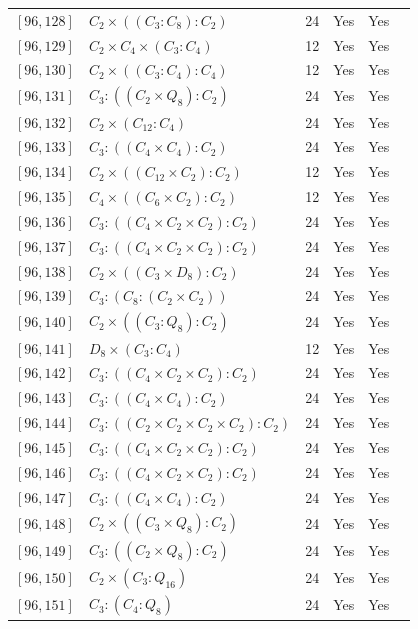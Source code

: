 \documentclass[12pt, a4paper]{article}
\theoremstyle{plain}
\theoremstyle{definition}
\begin{document}
\begin{longtable}{llcccl}
  $[96,128]$ & $C_2 \times ((C_3 : C_8) : C_2)$ & 24 & Yes & Yes \\
  $[96,129]$ & $C_2 \times C_4 \times (C_3 : C_4)$ & 12 & Yes & Yes \\
  $[96,130]$ & $C_2 \times ((C_3 : C_4) : C_4)$ & 12 & Yes & Yes \\
  $[96,131]$ & $C_3 : ((C_2 \times Q_8) : C_2)$ & 24 & Yes & Yes \\
  $[96,132]$ & $C_2 \times (C_{12} : C_4)$ & 24 & Yes & Yes \\
  $[96,133]$ & $C_3 : ((C_4 \times C_4) : C_2)$ & 24 & Yes & Yes \\
  $[96,134]$ & $C_2 \times ((C_{12} \times C_2) : C_2)$ & 12 & Yes & Yes \\
  $[96,135]$ & $C_4 \times ((C_6 \times C_2) : C_2)$ & 12 & Yes & Yes \\
  $[96,136]$ & $C_3 : ((C_4 \times C_2 \times C_2) : C_2)$ & 24 & Yes & Yes \\
  $[96,137]$ & $C_3 : ((C_4 \times C_2 \times C_2) : C_2)$ & 24 & Yes & Yes \\
  $[96,138]$ & $C_2 \times ((C_3 \times D_8) : C_2)$ & 24 & Yes & Yes \\
  $[96,139]$ & $C_3 : (C_8 : (C_2 \times C_2))$ & 24 & Yes & Yes \\
  $[96,140]$ & $C_2 \times ((C_3 : Q_8) : C_2)$ & 24 & Yes & Yes \\
  $[96,141]$ & $D_8 \times (C_3 : C_4)$ & 12 & Yes & Yes \\
  $[96,142]$ & $C_3 : ((C_4 \times C_2 \times C_2) : C_2)$ & 24 & Yes & Yes \\
  $[96,143]$ & $C_3 : ((C_4 \times C_4) : C_2)$ & 24 & Yes & Yes \\
  $[96,144]$ & $C_3 : ((C_2 \times C_2 \times C_2 \times C_2) : C_2)$ & 24 & Yes & Yes \\
  $[96,145]$ & $C_3 : ((C_4 \times C_2 \times C_2) : C_2)$ & 24 & Yes & Yes \\
  $[96,146]$ & $C_3 : ((C_4 \times C_2 \times C_2) : C_2)$ & 24 & Yes & Yes \\
  $[96,147]$ & $C_3 : ((C_4 \times C_4) : C_2)$ & 24 & Yes & Yes \\
  $[96,148]$ & $C_2 \times ((C_3 \times Q_8) : C_2)$ & 24 & Yes & Yes \\
  $[96,149]$ & $C_3 : ((C_2 \times Q_8) : C_2)$ & 24 & Yes & Yes \\
  $[96,150]$ & $C_2 \times (C_3 : Q_{16})$ & 24 & Yes & Yes \\
  $[96,151]$ & $C_3 : (C_4 : Q_8)$ & 24 & Yes & Yes \\

\end{longtable}
\end{document}
